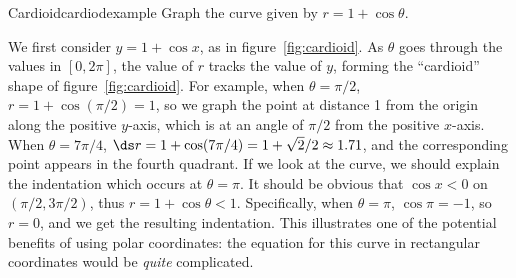 \begin{example}{Cardioid}{cardiodexample}
 Graph the curve given by $r=1+\cos\theta$. 
\end{example}

\begin{solution}
We first consider
$y=1+\cos x$, as in figure~\ref{fig:cardioid}. As $\theta$ goes
through the values in $[0,2\pi]$, the value of $r$ tracks the value of
$y$, forming the ``cardioid'' 
shape of  figure~\ref{fig:cardioid}.
For example, when $\theta=\pi/2$, $r=1+\cos(\pi/2)=1$, so we graph the
point at distance 1 from the origin along the positive $y$-axis, which
is at an angle of $\pi/2$ from the positive $x$-axis. When
$\theta=7\pi/4$, $\ds r=1+\cos(7\pi/4)=1+\sqrt2/2\approx 1.71$, and the
corresponding point appears in the fourth quadrant. If we look at the curve, we should explain the indentation which occurs at $\theta=\pi$. It should be obvious that $\cos x<0$ on $(\pi/2,3\pi/2)$, thus $r=1+\cos\theta<1$. Specifically, when $\theta=\pi$, $\cos\pi=-1$, so $r=0$, and we get the resulting indentation. This illustrates
one of the potential benefits of using polar coordinates: the equation
for this curve in rectangular coordinates would be \emph{quite} complicated.
\end{solution}


